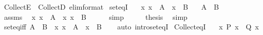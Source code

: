 \begin{isabellebody}
{\isacartoucheclose}%
\endisatagML
{\isafoldML}%
%
\isadelimML
%
\endisadelimML
\isanewline
\isanewline
{}\isamarkupfalse%
\ CollectE\ {\isacharequal}{\kern0pt}\ CollectD\ {\isacharbrackleft}{\kern0pt}elim{\isacharunderscore}{\kern0pt}format{\isacharbrackright}{\kern0pt}\isanewline
\isanewline
{}\isamarkupfalse%
\ set{\isacharunderscore}{\kern0pt}eqI{\isacharcolon}{\kern0pt}\isanewline
\ \ \ {\isachardoublequoteopen}{\isasymAnd}x{\isachardot}{\kern0pt}\ x\ {\isasymin}\ A\ {\isasymlongleftrightarrow}\ x\ {\isasymin}\ B{\isachardoublequoteclose}\isanewline
\ \ \ {\isachardoublequoteopen}A\ {\isacharequal}{\kern0pt}\ B{\isachardoublequoteclose}\isanewline
%
\isadelimproof
%
\endisadelimproof
%
\isatagproof
{}\isamarkupfalse%
\ {\isacharminus}{\kern0pt}\isanewline
\ \ \isamarkupfalse%
\ assms\ \isamarkupfalse%
\ {\isachardoublequoteopen}{\isacharbraceleft}{\kern0pt}x{\isachardot}{\kern0pt}\ x\ {\isasymin}\ A{\isacharbraceright}{\kern0pt}\ {\isacharequal}{\kern0pt}\ {\isacharbraceleft}{\kern0pt}x{\isachardot}{\kern0pt}\ x\ {\isasymin}\ B{\isacharbraceright}{\kern0pt}{\isachardoublequoteclose}\isanewline
\ \ \ \ \isamarkupfalse%
\ simp\isanewline
\ \ \isamarkupfalse%
\ \isamarkupfalse%
\ {\isacharquery}{\kern0pt}thesis\ \isamarkupfalse%
\ simp\isanewline
{}\isamarkupfalse%
%
\endisatagproof
{\isafoldproof}%
%
\isadelimproof
\isanewline
%
\endisadelimproof
\isanewline
{}\isamarkupfalse%
\ set{\isacharunderscore}{\kern0pt}eq{\isacharunderscore}{\kern0pt}iff{\isacharcolon}{\kern0pt}\ {\isachardoublequoteopen}A\ {\isacharequal}{\kern0pt}\ B\ {\isasymlongleftrightarrow}\ {\isacharparenleft}{\kern0pt}{\isasymforall}x{\isachardot}{\kern0pt}\ x\ {\isasymin}\ A\ {\isasymlongleftrightarrow}\ x\ {\isasymin}\ B{\isacharparenright}{\kern0pt}{\isachardoublequoteclose}\isanewline
%
\isadelimproof
\ \ %
\endisadelimproof
%
\isatagproof
{}\isamarkupfalse%
\ {\isacharparenleft}{\kern0pt}auto\ intro{\isacharcolon}{\kern0pt}set{\isacharunderscore}{\kern0pt}eqI{\isacharparenright}{\kern0pt}%
\endisatagproof
{\isafoldproof}%
%
\isadelimproof
\isanewline
%
\endisadelimproof
\isanewline
{}\isamarkupfalse%
\ Collect{\isacharunderscore}{\kern0pt}eqI{\isacharcolon}{\kern0pt}\isanewline
\ \ \ {\isachardoublequoteopen}{\isasymAnd}x{\isachardot}{\kern0pt}\ P\ x\ {\isacharequal}{\kern0pt}\ Q\ x{\isachardoublequoteclose}\isanewline

\end{isabellebody}
